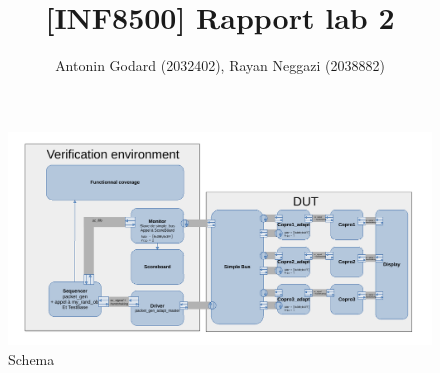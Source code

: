 \documentclass[a4paper, 10pt]{article}
\author{Antonin Godard (2032402), Rayan Neggazi (2038882)}
\title{\sffamily\textbf{[INF8500] Rapport lab 2}}
\begin{document}
\maketitle

\begin{figure}[htb]
	\centering
	\includegraphics[width=\linewidth]{schema.pdf}
	\caption{Schema}
	\label{fig:schema}
\end{figure}
\end{document}
